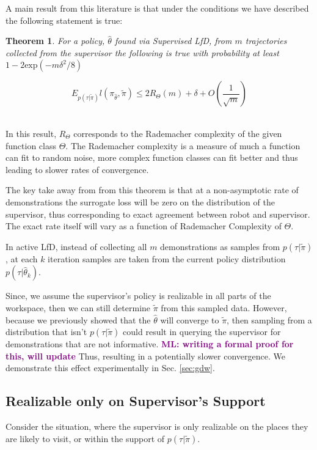 \documentclass[10pt, conference]{ieeeconf}      %
\newtheorem{theorem}{Theorem}[section]
\newcommand{\mlnote}[1]{\ifthenelse{ \boolean{include-notes}}%
 {\textcolor{purple}{\textbf{ML: #1}}}{}}
\begin{document}
A main result from this literature is that under the conditions we have described the following statement is true: \\

\begin{theorem}\label{thm:sup}
For a policy, $\hat{\theta}$ found via Supervised LfD, from $m$ trajectories collected from the supervisor the following is true with probability at least $1- 2\mbox{exp} (-m\delta^2/8)$

$$E_{p(\tau|\tilde{\pi})} l(\pi_{\hat{\theta}}, \tilde{\pi}) \leq 2R_{\Theta}(m) + \delta+ O(\frac{1}{\sqrt{m}})$$\\

\end{theorem}

In this result, $R_{\Theta}$ corresponds to the Rademacher complexity of the given function class $\Theta$. The Rademacher complexity is a measure of much a function can fit to random noise, more complex function classes can fit better and thus leading to slower rates of convergence. 

The key take away from from this theorem  is that at a non-asymptotic rate of demonstrations the surrogate loss will be zero on the distribution of the supervisor, thus corresponding to exact agreement between robot and supervisor. The exact rate itself will vary as a function of Rademacher Complexity of $\Theta$. 

In active LfD, instead of collecting all $m$ demonstrations as samples from $p(\tau |\tilde{\pi})$, at each $k$ iteration  samples are taken from the current policy distribution $p(\tau|\hat{\theta}_k)$.  

Since, we assume the supervisor's policy is realizable in all parts of the workspace, then we can still determine $\tilde{\pi}$ from this sampled data. However, because we previously showed that the $\hat{\theta}$ will converge to $\tilde{\pi}$, then sampling from a distribution that isn't $p(\tau|\tilde{\pi})$ could result in querying the supervisor for demonstrations that are not informative. \mlnote{writing a formal proof for this, will update} Thus, resulting in a potentially slower convergence. We demonstrate this effect experimentally in Sec. \ref{sec:gdw}. 

\subsection{Realizable only on Supervisor's Support}
Consider the situation, where the supervisor is only realizable on the places they are likely to visit, or within the support of $p(\tau|\tilde{\pi})$. 
\end{document}
